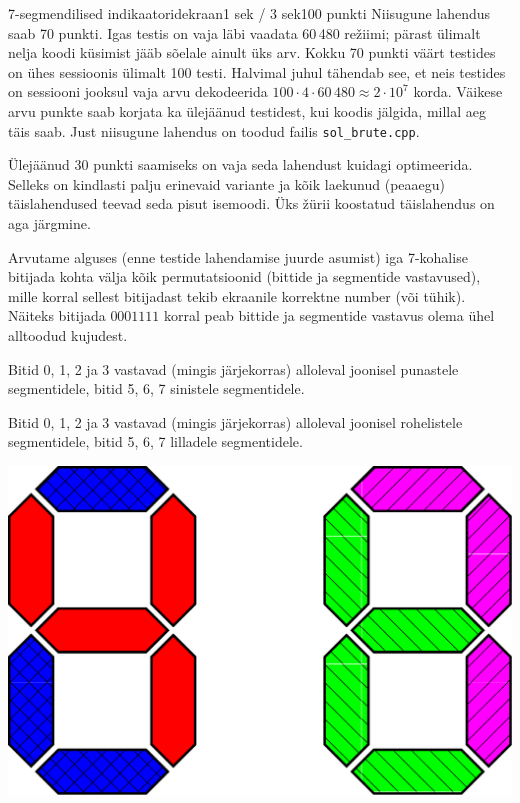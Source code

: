 \begin{yl}{6}{7-segmendilised indikaatorid}{ekraan}{1 sek / 3 sek}{100 punkti}
  Niisugune lahendus saab 70 punkti. Igas testis on vaja läbi vaadata 60\,480 režiimi;
  pärast ülimalt nelja koodi küsimist jääb sõelale ainult üks arv. Kokku 70 punkti
  väärt testides on ühes sessioonis ülimalt 100 testi. Halvimal juhul
  tähendab see, et neis testides on sessiooni jooksul vaja arvu dekodeerida
  $100 \cdot 4 \cdot 60\,480 \approx 2 \cdot 10^7$ korda. Väikese arvu punkte saab korjata
  ka ülejäänud testidest, kui koodis jälgida, millal aeg täis saab.
  Just niisugune lahendus on toodud failis \verb/sol_brute.cpp/.

  Ülejäänud 30 punkti saamiseks on vaja seda lahendust kuidagi optimeerida.
  Selleks on kindlasti palju erinevaid variante ja kõik laekunud (peaaegu) täislahendused
  teevad seda pisut isemoodi. Üks žürii koostatud täislahendus on aga järgmine.

  Arvutame alguses (enne testide lahendamise juurde asumist) iga 7-kohalise bitijada kohta
  välja kõik permutatsioonid (bittide ja segmentide vastavused), mille korral sellest
  bitijadast tekib ekraanile korrektne number (või tühik). Näiteks bitijada
  $0001111$ korral peab bittide ja segmentide vastavus olema ühel alltoodud kujudest.

  \begin{xitem}
  \item Bitid 0, 1, 2 ja 3 vastavad (mingis järjekorras) alloleval joonisel punastele
    segmentidele, bitid 5, 6, 7 sinistele segmentidele.
  \item Bitid 0, 1, 2 ja 3 vastavad (mingis järjekorras) alloleval joonisel rohelistele
    segmentidele, bitid 5, 6, 7 lilladele segmentidele.
  \end{xitem}

  \begin{center}
    \includegraphics[scale=0.2]{bitperm}
  \end{center}


\end{yl}
